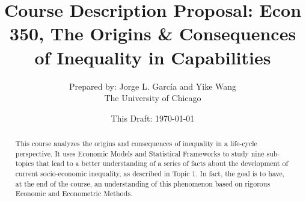 \documentclass[12pt]{article}
\begin{document}
\title{\textbf{Course Description Proposal: Econ 350, The Origins \& Consequences of Inequality in Capabilities }}
\author{Prepared by: Jorge L. Garc\'{i}a and Yike Wang \\ The University of Chicago}
\date{This Draft: \today}
\maketitle

\begin{abstract}
\noindent This course analyzes the origins and consequences of inequality in a life-cycle perspective. It uses Economic Models and Statistical Frameworks to study nine sub-topics that lead to a better understanding of a series of facts about the development of current socio-economic inequality, as described in Topic 1. In fact, the goal is to have, at the end of the course, an understanding of this phenomenon based on rigorous Economic and Econometric Methods.   
\end{abstract}
\end{document}

